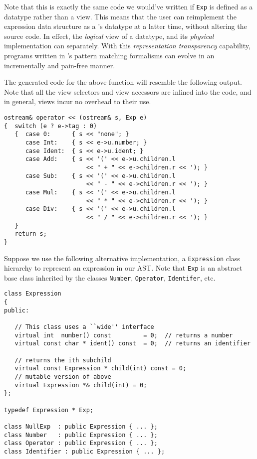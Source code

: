 Note that this is exactly the same code we would've written if
\verb|Exp| is defined as a datatype rather than a view.  This means
that the user can reimplement the expression data structure
as a \Prop's datatype at a latter time, without altering the \Prop{}
source code.  In effect, the {\em logical} view of a datatype, and its
{\em physical} implementation can separately.
With this {\em representation transparency} capability,
programs written in \Prop's pattern matching formalisms can evolve 
in an incrementally and pain-free manner.

The generated code for the above function will resemble the following
output.  Note that all the view selectors and view accessors are
inlined into the code, and in general, views incur no overhead to
their use.
\begin{verbatim}
ostream& operator << (ostream& s, Exp e)
{  switch (e ? e->tag : 0)
   {  case 0:      { s << "none"; }
      case Int:    { s << e->u.number; }
      case Ident:  { s << e->u.ident; }
      case Add:    { s << '(' << e->u.children.l 
                       << " + " << e->children.r << '); }
      case Sub:    { s << '(' << e->u.children.l 
                       << " - " << e->children.r << '); }
      case Mul:    { s << '(' << e->u.children.l 
                       << " * " << e->children.r << '); }
      case Div:    { s << '(' << e->u.children.l 
                       << " / " << e->children.r << '); }
   }
   return s;
}
\end{verbatim}


Suppose we use the following alternative implementation, a
\verb|Expression| class hierarchy to represent
an expression in our AST.  
Note that \verb|Exp| is an abstract base class inherited
by the classes \verb|Number|, \verb|Operator|, \verb|Identifer|, etc.

\begin{verbatim}
class Expression
{
public:

   // This class uses a ``wide'' interface
   virtual int  number() const         = 0;  // returns a number
   virtual const char * ident() const  = 0;  // returns an identifier

   // returns the ith subchild
   virtual const Expression * child(int) const = 0; 
   // mutable version of above
   virtual Expression *& child(int) = 0;     
};

typedef Expression * Exp;

class NullExp  : public Expression { ... };
class Number   : public Expression { ... };
class Operator : public Expression { ... };
class Identifier : public Expression { ... };
\end{verbatim}

